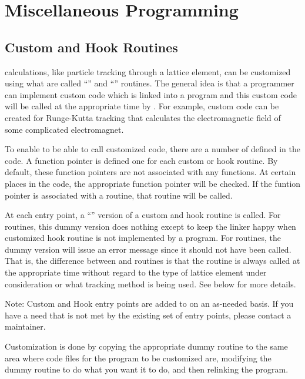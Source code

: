 \chapter{Miscellaneous Programming}

\section{Custom and Hook Routines}
\label{s:custom.hook}

\bmad calculations, like particle tracking through a lattice element, can be customized using what
are called ``'' and ``'' routines. The general idea is that a programmer can
implement custom code which is linked into a program and this custom code will be called at the
appropriate time by \bmad. For example, custom code can be created for Runge-Kutta tracking
that calculates the electromagnetic field of some complicated electromagnet.

To enable \bmad to be able to call customized code, there are a number of 
defined in the \bmad code. A function pointer is defined one for each custom or hook routine. By
default, these function pointers are not associated with any functions.  At certain places in the
\bmad code, the appropriate function pointer will be checked. If the funtion pointer is associated
with a routine, that routine will be called.

\etcetc

At each entry point, a ``'' version of a custom and hook
routine is called. For  routines, this dummy version does nothing except to keep the linker
happy when customized hook routine is not implemented by a program. For  routines, the
dummy version will issue an error message since it should not have been called. That is, the
difference between  and  routines is that the  routine is always called
at the appropriate time without regard to the type of lattice element under consideration or what
tracking method is being used. See below for more details.

Note: Custom and Hook entry points are added to \bmad on an as-needed basis. If you have a need that
is not met by the existing set of entry points, please contact a \bmad maintainer.

Customization is done by copying the appropriate dummy routine to the same area where code files for
the program to be customized are, modifying the dummy routine to do what you want it to do, and then
relinking the program.

